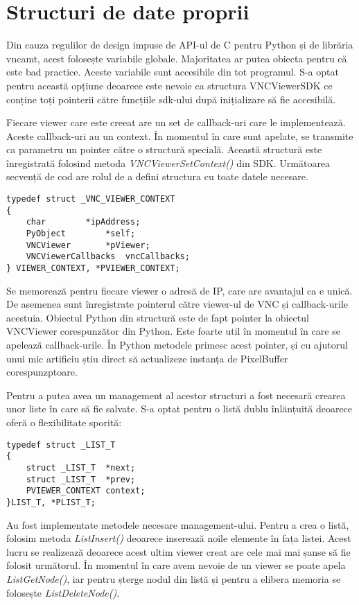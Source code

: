 \section{Structuri de date proprii}

Din cauza regulilor de design impuse de API-ul de C pentru Python și de librăria vncamt, acest folosește variabile globale. Majoritatea ar putea obiecta pentru că este bad practice. Aceste variabile sunt accesibile din tot programul. S-a optat pentru această opțiune deoarece este nevoie ca structura VNCViewerSDK ce conține toți pointerii către funcțiile sdk-ului după inițializare să fie accesibilă.

Fiecare viewer care este creeat are un set de callback-uri care le implementează. Aceste callback-uri au un context. În momentul în care sunt apelate, se transmite ca parametru un pointer către o structură specială. Această structură este înregistrată folosind metoda \textit{VNCViewerSetContext()} din SDK. Următoarea secvență de cod are rolul de a defini structura cu toate datele necesare.
\lstset{language=C,frame=single, showstringspaces=false}
\begin{lstlisting}
typedef struct _VNC_VIEWER_CONTEXT
{
    char		*ipAddress;                    
    PyObject		*self;                     
    VNCViewer		*pViewer;                 
    VNCViewerCallbacks	vncCallbacks;    
} VIEWER_CONTEXT, *PVIEWER_CONTEXT;
\end{lstlisting}

Se memorează pentru fiecare viewer o adresă de IP, care are avantajul ca e unică. De asemenea sunt înregistrate pointerul către viewer-ul de VNC și callback-urile acestuia. Obiectul Python din structură este de fapt pointer la obiectul VNCViewer corespunzător din Python. Este foarte util în momentul în care se apelează callback-urile. În Python metodele primesc acest pointer, și cu ajutorul unui mic artificiu știu direct să actualizeze instanța de PixelBuffer corespunzptoare.

Pentru a putea avea un management al acestor structuri a fost necesară crearea unor liste în care să fie salvate. S-a optat pentru o listă dublu înlănțuită deoarece oferă o flexibilitate sporită: 
\lstset{language=C,frame=single, showstringspaces=false}
\begin{lstlisting}
typedef struct _LIST_T
{
    struct _LIST_T	*next;
    struct _LIST_T	*prev;
    PVIEWER_CONTEXT	context;
}LIST_T, *PLIST_T;
\end{lstlisting}

Au fost implementate metodele necesare management-ului. Pentru a crea o listă, folosim metoda \textit{ListInsert()} deoarece inserează noile elemente în fața listei. Acest lucru se realizează deoarece acest ultim viewer creat are cele mai mai șanse să fie folosit următorul. În momentul în care avem nevoie de un viewer se poate apela \textit{ListGetNode()}, iar pentru șterge nodul din listă și pentru a elibera memoria se folosește \textit{ListDeleteNode()}.


